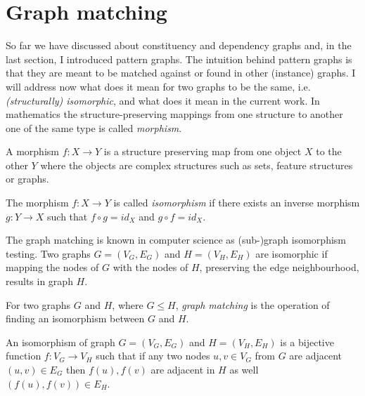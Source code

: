 \section{Graph matching}
\label{sec:graph-matching}

So far we have discussed about constituency and dependency graphs and, in the last section, I introduced pattern graphs. The intuition behind pattern graphs is that they are meant to be matched against or found in other (instance) graphs. I will address now what does it mean for two graphs to be the same, i.e. \textit{(structurally) isomorphic}, and what does it mean in the current work. In mathematics the structure-preserving mappings from one structure to another one of the same type is called \textit{morphism}. 

\begin{definition}[Morphism]\label{def:morphism}
    A morphism $f:X \rightarrow Y$ is a structure preserving map from one object $X$ to the other $Y$ where the objects are complex structures such as sets, feature structures or graphs.
\end{definition}


\begin{definition}[Isomorphism]\label{def:isomorphism}
    The morphism $f:X \rightarrow Y$ is called \textit{isomorphism} if there exists an inverse morphism $g:Y \rightarrow X$ such that $f \circ g = id_{X}$ and $ g \circ f = id_{X}$.
\end{definition}

The graph matching is known in computer science as (sub-)graph isomorphism testing. Two graphs $G=(V_G,E_G)$ and $H=(V_H,E_H)$ are isomorphic if mapping the nodes of $G$ with the nodes of $H$, preserving the edge neighbourhood, results in graph $H$. 

\begin{definition}\label{def:gmatching}
    For two graphs $G$ and $H$, where $G \leq H$, \textit{graph matching} is the operation of finding an isomorphism between $G$ and $H$.
\end{definition}

\begin{definition}\label{def:gisomorphism}
    An isomorphism of graph $G=(V_G,E_G)$ and $H=(V_H,E_H)$ is a bijective function $f:V_G \rightarrow V_H$ such that if any two nodes  $u,v \in V_G$ from $G$ are adjacent $(u,v) \in E_G$ then $f(u), f(v)$ are adjacent in $H$ as well $(f(u), f(v)) \in E_H $.
\end{definition}

